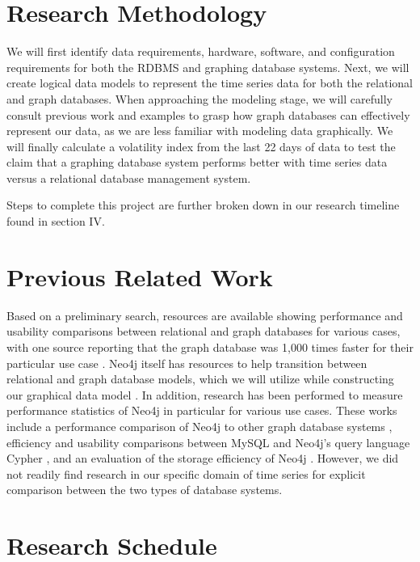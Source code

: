 \documentclass{IEEEtran}
\begin{document}
\section{Research Methodology}

We will first identify data requirements, hardware, software, and configuration requirements for both the RDBMS and graphing database systems. Next, we will create logical data models to represent the time series data for both the relational and graph databases. When approaching the modeling stage, we will carefully consult previous work and examples to grasp how graph databases can effectively represent our data, as we are less familiar with modeling data graphically. We will finally calculate a volatility index from the last 22 days of data to test the claim that a graphing database system performs better with time series data versus a relational database management system.

Steps to complete this project are further broken down in our research timeline found in section IV.

\section{Previous Related Work}

Based on a preliminary search, resources are available showing performance and usability comparisons between relational and graph databases for various cases, with one source reporting that the graph database was 1,000 times faster for their particular use case \cite{dzone}. Neo4j itself has resources to help transition between relational and graph database models, which we will utilize while constructing our graphical data model \cite{neo4j}. In addition, research has been performed to measure performance statistics of Neo4j in particular for various use cases. These works include a performance comparison of Neo4j to other graph database systems \cite{graph-query}, efficiency and usability comparisons between MySQL and Neo4j's query language Cypher \cite{graph-survey}, and an evaluation of the storage efficiency of Neo4j \cite{storage-perf}. However, we did not readily find research in our specific domain of time series for explicit comparison between the two types of database systems.

\section{Research Schedule}
\end{document}
